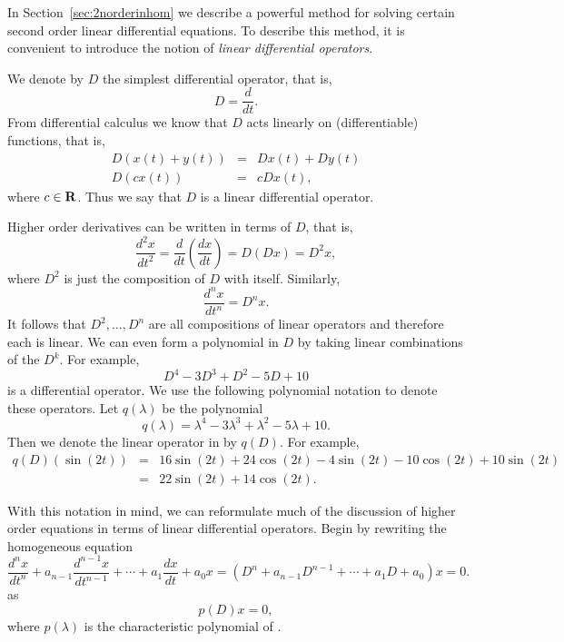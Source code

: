 \label{S:LDO}

In Section~\ref{sec:2norderinhom} we describe a powerful method for 
solving certain second order linear differential equations.  To describe 
this method, it is convenient to introduce the notion of {\em linear 
differential operators}.

We denote by $D$ the simplest differential 
operator, that is,
\[
D=\frac{d}{dt}.
\]
From differential calculus we know that $D$ acts linearly on 
(differentiable) functions, that is,
\begin{eqnarray*}
D(x(t)+y(t)) & = & Dx(t) + Dy(t) \\
D(cx(t)) & = & cDx(t),
\end{eqnarray*}
where $c\in\mbox{$\bf{R}$}$.  Thus we say that $D$ is a linear differential operator.

Higher order derivatives can be written in terms of $D$, that is,
\[
\frac{d^2x}{dt^2} = \frac{d}{dt}\left(\frac{dx}{dt}\right) = D(Dx) = D^2x,
\]
where $D^2$ is just the composition of $D$ with itself.  Similarly, 
\[
\frac{d^nx}{dt^n} = D^nx.
\]
It follows that $D^2,\ldots,D^n$ are all compositions of linear operators
and therefore each is linear.  We can even form a polynomial in $D$ by taking
linear combinations of the $D^k$.  For example,
\begin{equation}  \label{E:pdo}
D^4 - 3D^3 + D^2 -5D + 10 
\end{equation}
is a differential operator.  
We use the following polynomial notation to 
denote these operators.  Let $q(\lambda)$ be the polynomial
\[
q(\lambda) = \lambda^4 -3\lambda^3 + \lambda^2 - 5\lambda +10.
\]
Then we denote the linear operator in  by $q(D)$.  For example,
\begin{eqnarray*}
q(D)(\sin(2t)) & = & 16\sin(2t) + 24\cos(2t) - 4\sin(2t) - 10\cos(2t) + 
10\sin(2t) \\ & = & 22\sin(2t) + 14\cos(2t).
\end{eqnarray*}


With this notation in mind, we can reformulate much of the discussion of 
higher order equations in terms of linear differential operators.  Begin by 
rewriting the homogeneous equation  
\[
\frac{d^nx}{dt^n}+a_{n-1}\frac{d^{n-1}x}{dt^{n-1}}+\cdots+
a_1\frac{dx}{dt}+a_0x = (D^n+a_{n-1}D^{n-1}+\cdots+a_1D+a_0)x = 0.
\]
as
\begin{equation}  \label{E:opern2}
p(D)x = 0,
\end{equation}
where $p(\lambda)$ is the characteristic 
polynomial 
of .

